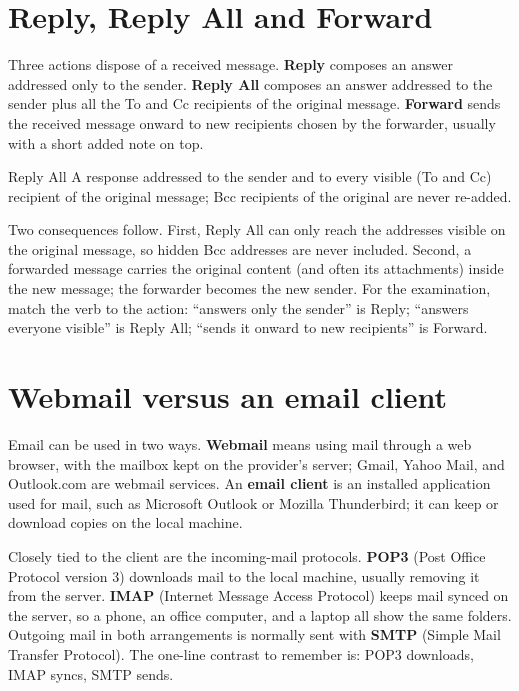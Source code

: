 \section{Reply, Reply All and Forward}
Three actions dispose of a received message. \textbf{Reply} composes an answer
addressed only to the sender. \textbf{Reply All} composes an answer addressed
to the sender plus all the To and Cc recipients of the original message.
\textbf{Forward} sends the received message onward to new recipients chosen
by the forwarder, usually with a short added note on top.

\begin{definitionbox}{Reply All}
A response addressed to the sender and to every visible (To and Cc)
recipient of the original message; Bcc recipients of the original are never
re-added.
\end{definitionbox}

Two consequences follow. First, Reply All can only reach the addresses visible
on the original message, so hidden Bcc addresses are never included. Second,
a forwarded message carries the original content (and often its attachments)
inside the new message; the forwarder becomes the new sender. For the
examination, match the verb to the action: ``answers only the sender'' is
Reply; ``answers everyone visible'' is Reply All; ``sends it onward to new
recipients'' is Forward.

\section{Webmail versus an email client}
Email can be used in two ways. \textbf{Webmail} means using mail through a
web browser, with the mailbox kept on the provider's server; Gmail, Yahoo
Mail, and Outlook.com are webmail services. An \textbf{email client} is an
installed application used for mail, such as Microsoft Outlook or Mozilla
Thunderbird; it can keep or download copies on the local machine.

Closely tied to the client are the incoming-mail protocols. \textbf{POP3}
(Post Office Protocol version 3) downloads mail to the local machine, usually
removing it from the server. \textbf{IMAP} (Internet Message Access Protocol)
keeps mail synced on the server, so a phone, an office computer, and a laptop
all show the same folders. Outgoing mail in both arrangements is normally
sent with \textbf{SMTP} (Simple Mail Transfer Protocol). The one-line
contrast to remember is: POP3 downloads, IMAP syncs, SMTP sends.

